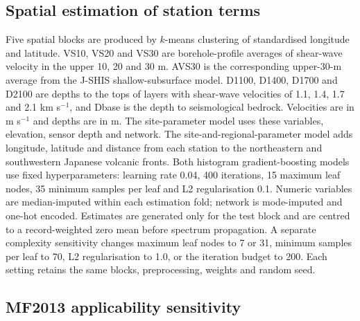 \documentclass[10pt]{article}
\begin{document}
\subsection*{Spatial estimation of station terms}

Five spatial blocks are produced by $k$-means clustering of standardised longitude and latitude. VS10, VS20 and VS30 are borehole-profile averages of shear-wave velocity in the upper 10, 20 and 30 m. AVS30 is the corresponding upper-30-m average from the J-SHIS shallow-subsurface model. D1100, D1400, D1700 and D2100 are depths to the tops of layers with shear-wave velocities of 1.1, 1.4, 1.7 and 2.1 km s$^{-1}$, and Dbase is the depth to seismological bedrock. Velocities are in m s$^{-1}$ and depths are in m. The site-parameter model uses these variables, elevation, sensor depth and network. The site-and-regional-parameter model adds longitude, latitude and distance from each station to the northeastern and southwestern Japanese volcanic fronts. Both histogram gradient-boosting models use fixed hyperparameters: learning rate 0.04, 400 iterations, 15 maximum leaf nodes, 35 minimum samples per leaf and L2 regularisation 0.1. Numeric variables are median-imputed within each estimation fold; network is mode-imputed and one-hot encoded. Estimates are generated only for the test block and are centred to a record-weighted zero mean before spectrum propagation. A separate complexity sensitivity changes maximum leaf nodes to 7 or 31, minimum samples per leaf to 70, L2 regularisation to 1.0, or the iteration budget to 200. Each setting retains the same blocks, preprocessing, weights and random seed.

\subsection*{MF2013 applicability sensitivity}
\end{document}
